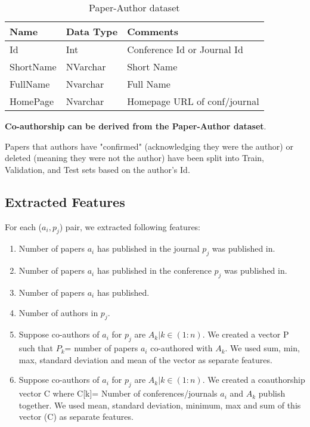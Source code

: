 \documentclass[a4paper]{article}
\begin{document}
\begin{table}
  \caption{Paper-Author dataset}
\begin{tabular}{ |l |l |l |}
  \hline
 \textbf{Name} & \textbf{Data Type} & \textbf{Comments} \\ \hline
  Id & Int & Conference Id or Journal Id \\ \hline
  ShortName & NVarchar & Short Name\\ \hline
  FullName & Nvarchar & Full Name\\ \hline
  HomePage & Nvarchar & Homepage URL of conf/journal \\ \hline
\end{tabular}
\label{table:confjournal}
\end{table}

\textbf{Co-authorship can be derived from the Paper-Author dataset}.

 

Papers that authors have "confirmed" (acknowledging they were the author) or deleted (meaning they were not the author) have been split into Train, Validation, and Test sets based on the author's Id. 


\subsection{Extracted Features}

For each ($a_i,p_j$) pair, we extracted following features:
\begin{enumerate}
\item Number of papers $a_i$ has published in the journal $p_j$ was published in.
\item Number of papers $a_i$ has published in the conference $p_j$ was published in.
\item Number of papers $a_i$ has published.
\item Number of authors in $p_j$.
\item Suppose co-authors of $a_i$ for $p_j$ are $A_k | k \in (1:n)$. We created a vector P such that $P_{k}$= number of papers $a_i$ co-authored with $A_k$. We used sum, min, max, standard deviation and mean of the vector as separate features.
\item Suppose co-authors of $a_i$ for $p_j$ are $A_k | k \in (1:n)$. We created a coauthorship vector C where C[k]= Number of conferences/journals $a_i$ and $A_k$ publish together. We used mean, standard deviation, minimum, max and sum of this vector (C) as separate features.  
\end{enumerate}
\end{document}
